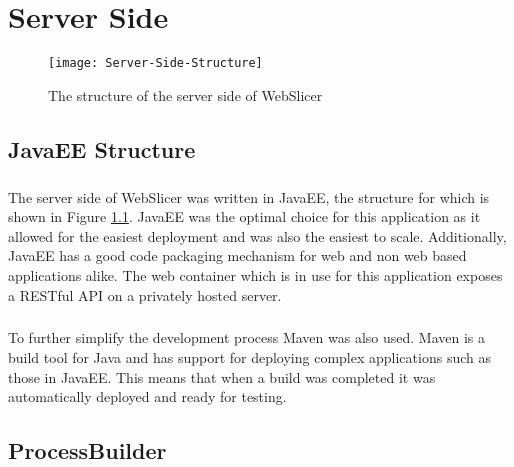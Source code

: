 \chapter{Server Side}
\begin{figure}[!ht]
  \centering
  \texttt{[image: Server-Side-Structure]}
  \caption{The structure of the server side of WebSlicer}
  \label{fig:server-side-structure}
\end{figure}

\section{JavaEE Structure}
\paragraph{}
The server side of WebSlicer was written in JavaEE, the structure for which is shown in Figure \ref{fig:server-side-structure}.
JavaEE was the optimal choice for this application as it allowed for the easiest deployment and was also the easiest to scale.
Additionally, JavaEE has a good code packaging mechanism for web and non web based applications alike.
The web container which is in use for this application exposes a RESTful API on a privately hosted server.

\paragraph{}
To further simplify the development process Maven was also used.
Maven is a build tool for Java and has support for deploying complex applications such as those in JavaEE.
This means that when a build was completed it was automatically deployed and ready for testing.

\section{ProcessBuilder}
